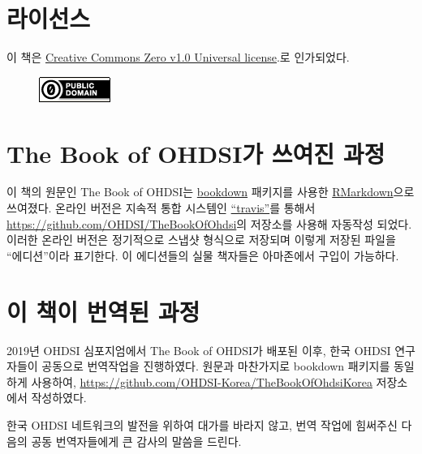 \documentclass[11pt]{book}
\theoremstyle{definition}
\theoremstyle{definition}
\theoremstyle{definition}
\theoremstyle{remark}
\begin{document}
\section*{라이선스}

이 책은
\href{http://creativecommons.org/publicdomain/zero/1.0/}{Creative
Commons Zero v1.0 Universal license}.로 인가되었다.

\begin{figure}
\centering
\includegraphics{images/Preface/cc0.png}
\caption{}
\end{figure}

\section*{The Book of OHDSI가 쓰여진 과정}\label{the-book-of-ohdsi--}

이 책의 원문인 The Book of OHDSI는 \href{https://bookdown.org}{bookdown}
패키지를 사용한 \href{https://rmarkdown.rstudio.com}{RMarkdown}으로
쓰여졌다. 온라인 버전은 지속적 통합 시스템인
\href{http://travis-ci.org/}{``travis''}를 통해서
\url{https://github.com/OHDSI/TheBookOfOhdsi}의 저장소를 사용해 자동작성
되었다. 이러한 온라인 버전은 정기적으로 스냅샷 형식으로 저장되며 이렇게
저장된 파일을 ``에디션''이라 표기한다. 이 에디션들의 실물 책자들은
아마존에서 구입이 가능하다.

\section*{이 책이 번역된 과정}\label{---}

2019년 OHDSI 심포지엄에서 The Book of OHDSI가 배포된 이후, 한국 OHDSI
연구자들이 공동으로 번역작업을 진행하였다. 원문과 마찬가지로 bookdown
패키지를 동일하게 사용하여,
\url{https://github.com/OHDSI-Korea/TheBookOfOhdsiKorea} 저장소에서
작성하였다.

한국 OHDSI 네트워크의 발전을 위하여 대가를 바라지 않고, 번역 작업에
힘써주신 다음의 공동 번역자들에게 큰 감사의 말씀을 드린다.
\end{document}
